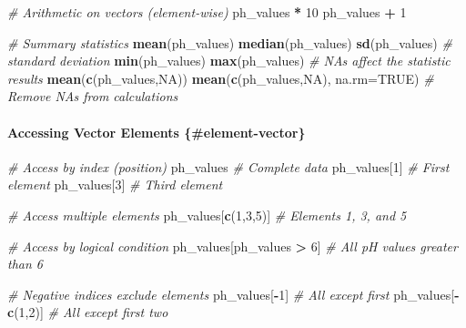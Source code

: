 \documentclass[
  10pt,
  b5paper,
  oneside]{book}
\newenvironment{Shaded}{\begin{snugshade}}{\end{snugshade}}
\newcommand{\AttributeTok}[1]{\textcolor[rgb]{0.13,0.29,0.53}{#1}}
\newcommand{\CommentTok}[1]{\textcolor[rgb]{0.56,0.35,0.01}{\textit{#1}}}
\newcommand{\ConstantTok}[1]{\textcolor[rgb]{0.56,0.35,0.01}{#1}}
\newcommand{\DecValTok}[1]{\textcolor[rgb]{0.00,0.00,0.81}{#1}}
\newcommand{\FunctionTok}[1]{\textcolor[rgb]{0.13,0.29,0.53}{\textbf{#1}}}
\newcommand{\NormalTok}[1]{#1}
\newcommand{\SpecialCharTok}[1]{\textcolor[rgb]{0.81,0.36,0.00}{\textbf{#1}}}
\begin{document}
\begin{Shaded}
\begin{Highlighting}[]
\CommentTok{\# Arithmetic on vectors (element{-}wise)}
\NormalTok{ph\_values }\SpecialCharTok{*} \DecValTok{10}
\NormalTok{ph\_values }\SpecialCharTok{+} \DecValTok{1}

\CommentTok{\# Summary statistics}
\FunctionTok{mean}\NormalTok{(ph\_values)}
\FunctionTok{median}\NormalTok{(ph\_values)}
\FunctionTok{sd}\NormalTok{(ph\_values)        }\CommentTok{\# standard deviation}
\FunctionTok{min}\NormalTok{(ph\_values)}
\FunctionTok{max}\NormalTok{(ph\_values)}
\CommentTok{\# NAs affect the statistic results}
\FunctionTok{mean}\NormalTok{(}\FunctionTok{c}\NormalTok{(ph\_values,}\ConstantTok{NA}\NormalTok{))}
\FunctionTok{mean}\NormalTok{(}\FunctionTok{c}\NormalTok{(ph\_values,}\ConstantTok{NA}\NormalTok{), }\AttributeTok{na.rm=}\ConstantTok{TRUE}\NormalTok{) }\CommentTok{\# Remove NAs from calculations}
\end{Highlighting}
\end{Shaded}

\paragraph*{Accessing Vector Elements \{\#element-vector\}}\label{accessing-vector-elements-element-vector}

\begin{Shaded}
\begin{Highlighting}[]
\CommentTok{\# Access by index (position)}
\NormalTok{ph\_values           }\CommentTok{\# Complete data}
\NormalTok{ph\_values[}\DecValTok{1}\NormalTok{]        }\CommentTok{\# First element}
\NormalTok{ph\_values[}\DecValTok{3}\NormalTok{]        }\CommentTok{\# Third element}

\CommentTok{\# Access multiple elements}
\NormalTok{ph\_values[}\FunctionTok{c}\NormalTok{(}\DecValTok{1}\NormalTok{,}\DecValTok{3}\NormalTok{,}\DecValTok{5}\NormalTok{)]  }\CommentTok{\# Elements 1, 3, and 5}

\CommentTok{\# Access by logical condition}
\NormalTok{ph\_values[ph\_values }\SpecialCharTok{\textgreater{}} \DecValTok{6}\NormalTok{]     }\CommentTok{\# All pH values greater than 6}

\CommentTok{\# Negative indices exclude elements}
\NormalTok{ph\_values[}\SpecialCharTok{{-}}\DecValTok{1}\NormalTok{]       }\CommentTok{\# All except first}
\NormalTok{ph\_values[}\SpecialCharTok{{-}}\FunctionTok{c}\NormalTok{(}\DecValTok{1}\NormalTok{,}\DecValTok{2}\NormalTok{)]  }\CommentTok{\# All except first two}
\end{Highlighting}
\end{Shaded}
\end{document}
